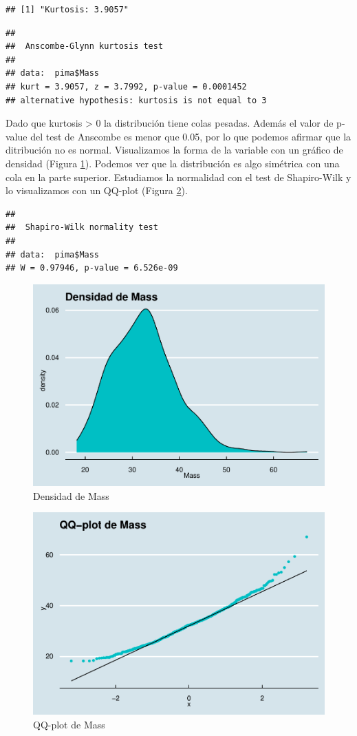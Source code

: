 \documentclass[
]{article}
\begin{document}
\begin{verbatim}
## [1] "Kurtosis: 3.9057"
\end{verbatim}

\begin{verbatim}
## 
##  Anscombe-Glynn kurtosis test
## 
## data:  pima$Mass
## kurt = 3.9057, z = 3.7992, p-value = 0.0001452
## alternative hypothesis: kurtosis is not equal to 3
\end{verbatim}

Dado que kurtosis \textgreater{} 0 la distribución tiene colas pesadas.
Además el valor de p-value del test de Anscombe es menor que 0.05, por
lo que podemos afirmar que la ditribución no es normal. Visualizamos la
forma de la variable con un gráfico de densidad (Figura
\ref{fig:dens_mass}). Podemos ver que la distribución es algo simétrica
con una cola en la parte superior. Estudiamos la normalidad con el test
de Shapiro-Wilk y lo visualizamos con un QQ-plot (Figura
\ref{fig:qq_mass}).

\begin{verbatim}
## 
##  Shapiro-Wilk normality test
## 
## data:  pima$Mass
## W = 0.97946, p-value = 6.526e-09
\end{verbatim}

\begin{figure}

{\centering \includegraphics[width=0.5\linewidth]{pima-clasificacion_files/figure-latex/dens_mass-1} 

}

\caption{Densidad de Mass}\label{fig:dens_mass}
\end{figure}

\begin{figure}

{\centering \includegraphics[width=0.5\linewidth]{pima-clasificacion_files/figure-latex/qq_mass-1} 

}

\caption{QQ-plot de Mass}\label{fig:qq_mass}
\end{figure}
\end{document}
